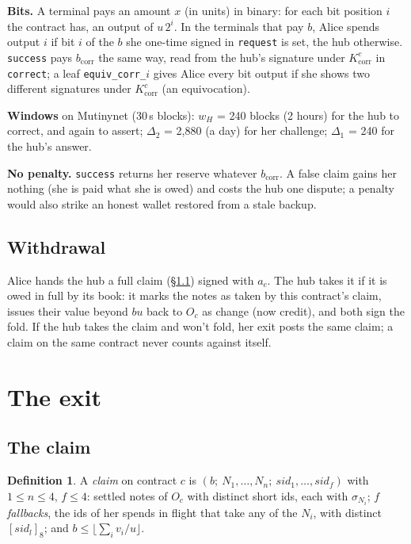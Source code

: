 \documentclass[11pt]{article}
\theoremstyle{plain}
\theoremstyle{definition}
\newtheorem{definition}{Definition}
\newcommand{\bcorr}{b_{\mathrm{corr}}}
\newcommand{\tx}[1]{\texttt{#1}}
\newcommand{\pre}[1]{[#1]_8}                         %
\newcommand{\sid}{\mathit{sid}}
\newcommand{\Oc}{O_c}
\begin{document}
\textbf{Bits.} A terminal pays an amount $x$ (in units) in binary: for
each bit position $i$ the contract has, an output of $u\,2^i$. In the
terminals that pay $b$, Alice spends output $i$ if bit $i$ of the $b$
she one-time signed in \tx{request} is set, the hub otherwise.
\tx{success} pays $\bcorr$ the same way, read from the hub's signature
under $K_{\mathrm{corr}}^c$ in \tx{correct}; a leaf \tx{equiv\_corr\_$i$} gives
Alice every bit output if she shows two different signatures under
$K_{\mathrm{corr}}^c$ (an equivocation).

\textbf{Windows} on Mutinynet (30\,s blocks): $w_H$ = 240 blocks (2
hours) for the hub to correct, and again to assert; $\Delta_2$ = 2,880
(a day) for her challenge; $\Delta_1$ = 240 for the hub's answer.

\textbf{No penalty.} \tx{success} returns her reserve whatever
$\bcorr$. A false claim gains her nothing (she is paid what she is
owed) and costs the hub one dispute; a penalty would also strike an
honest wallet restored from a stale backup.

\subsection{Withdrawal}\label{sec:withdrawal}

Alice hands the hub a full claim (\S\ref{sec:claim}) signed with $a_c$.
The hub takes it if it is owed in full by its book: it marks the notes
as taken by this contract's claim, issues their value beyond $bu$ back
to $\Oc$ as change (now credit), and both sign the fold. If the hub
takes the claim and won't fold, her exit posts the same claim; a claim
on the same contract never counts against itself.

\section{The exit}\label{sec:exit}

\subsection{The claim}\label{sec:claim}

\begin{definition}
A \emph{claim} on contract $c$ is $(b;\ N_1, \dots, N_n;\ \sid_1, \dots,
\sid_f)$ with $1 \le n \le 4$, $f \le 4$: settled notes of $\Oc$ with
distinct short ids, each with $\sigma_{N_i}$; $f$ \emph{fallbacks}, the
ids of her spends in flight that take any of the $N_i$, with distinct
$\pre{\sid_l}$; and $b \le \lfloor \sum_i v_i / u \rfloor$.
\end{definition}
\end{document}
